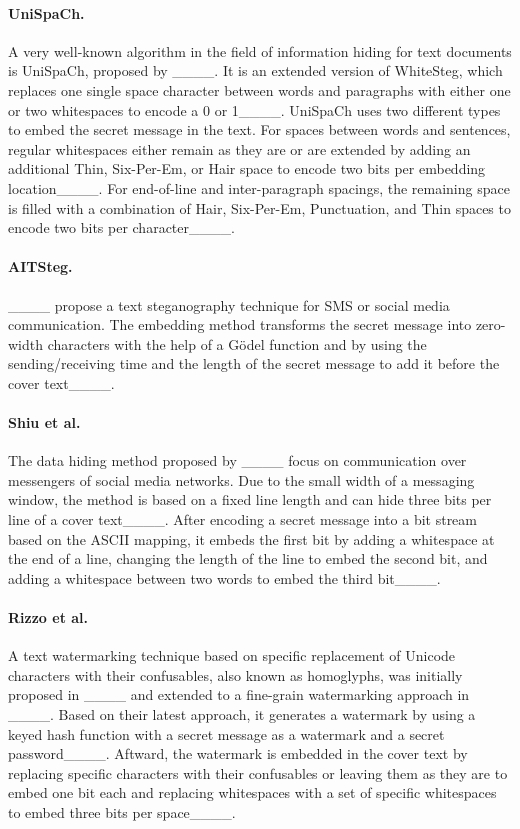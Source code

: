 	\paragraph{UniSpaCh.} A very well-known algorithm in the field of information hiding for text documents is UniSpaCh, proposed by ____. It is an extended version of WhiteSteg, which replaces one single space character between words and paragraphs with either one or two whitespaces to encode a 0 or 1____. UniSpaCh uses two different types to embed the secret message in the text. For spaces between words and sentences, regular whitespaces either remain as they are or are extended by adding an additional Thin, Six-Per-Em, or Hair space to encode two bits per embedding location____. For end-of-line and inter-paragraph spacings, the remaining space is filled with a combination of Hair, Six-Per-Em, Punctuation, and Thin spaces to encode two bits per character____.
	
	\paragraph{AITSteg.} ____ propose a text steganography technique for SMS or social media communication. The embedding method transforms the secret message into zero-width characters with the help of a Gödel function and by using the sending/receiving time and the length of the secret message to add it before the cover text____.
	
	\paragraph{Shiu et al.} The data hiding method proposed by ____ focus on communication over messengers of social media networks. Due to the small width of a messaging window, the method is based on a fixed line length and can hide three bits per line of a cover text____. After encoding a secret message into a bit stream based on the ASCII mapping, it embeds the first bit by adding a whitespace at the end of a line, changing the length of the line to embed the second bit, and adding a whitespace between two words to embed the third bit____.
	
	\paragraph{Rizzo et al.} A text watermarking technique based on specific replacement of Unicode characters with their confusables, also known as homoglyphs, was initially proposed in ____ and extended to a fine-grain watermarking approach in ____. Based on their latest approach, it generates a watermark by using a keyed hash function with a secret message as a watermark and a secret password____. Aftward, the watermark is embedded in the cover text by replacing specific characters with their confusables or leaving them as they are to embed one bit each and replacing whitespaces with a set of specific whitespaces to embed three bits per space____.
	
